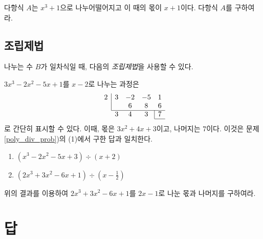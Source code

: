 \documentclass{oblivoir}
\begin{document}
%
\prob{}
다항식 \(A\)는 \(x^3+1\)으로 나누어떨어지고 이 때의 몫이 \(x+1\)이다.
다항식 \(A\)를 구하여라.

\clearpage
\subsection{조립제법}
나누는 수 \(B\)가 일차식일 때, 다음의 \emph{조립제법}을 사용할 수 있다.

%
\exam{}
\(3x^3-2x^2-5x+1\)를 \(x-2\)로 나누는 과정은
\begin{equation*}
\begin{array}{ccccc}
\multicolumn{1}{c|}{2}	&3	&-2	&-5	&1\\
\multicolumn{1}{c|}{}		&	&6	&8	&6\\
\cline{2-5}
							&3	&4	&3	&\multicolumn1{|c}{7}\\
\cline{5-5}
\end{array}
\end{equation*}
로 간단히 표시할 수 있다.
이때, 몫은 \(3x^2+4x+3\)이고, 나머지는 \(7\)이다.
이것은 문제 \ref{poly_div_prob})의 (1)에서 구한 답과 일치한다.

%
\begin{enumerate}[(1)]
\item
\((x^3-2x^2-5x+3)\div(x+2)\)
\item
\((2x^3+3x^2-6x+1)\div(x-\frac12)\)
\end{enumerate}

%
\prob{}
위의 결과를 이용하여 \(2x^3+3x^2-6x+1\)를 \(2x-1\)로 나눈 몫과 나머지를 구하여라.

\section*{답}
\end{document}
